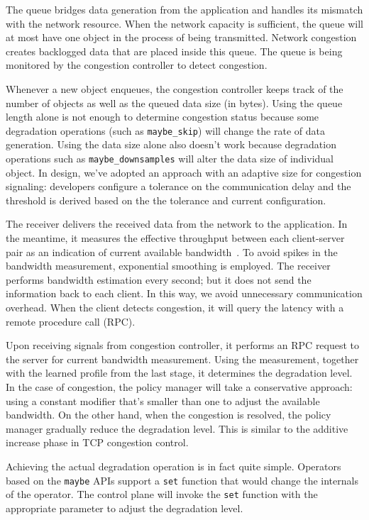  The queue bridges data generation from the
application and handles its mismatch with the network resource. When the network
capacity is sufficient, the queue will at most have one object in the process of
being transmitted. Network congestion creates backlogged data that are placed
inside this queue. The queue is being monitored by the congestion controller to
detect congestion.

 Whenever a new object enqueues, the congestion
controller keeps track of the number of objects as well as the queued data size
(in bytes). Using the queue length alone is not enough to determine congestion
status because some degradation operations (such as \texttt{maybe\_skip}) will
change the rate of data generation. Using the data size alone also doesn't work
because degradation operations such as \texttt{maybe\_downsamples} will alter
the data size of individual object. In \sysname{} design, we've adopted an
approach with an adaptive size for congestion signaling: developers configure a
tolerance on the communication delay and the threshold is derived based on the
the tolerance and current configuration.

 The receiver delivers the received data from the
network to the application. In the meantime, it measures the effective
throughput between each client-server pair as an indication of current available
bandwidth~\cite{iperf}. To avoid spikes in the bandwidth measurement,
exponential smoothing is employed. The receiver performs bandwidth estimation
every second; but it does not send the information back to each client. In this
way, we avoid unnecessary communication overhead. When the client detects
congestion, it will query the latency with a remote procedure call (RPC).

 Upon receiving signals from congestion controller, it
performs an RPC request to the server for current bandwidth measurement. Using
the measurement, together with the learned profile from the last stage, it
determines the degradation level. In the case of congestion, the policy manager
will take a conservative approach: using a constant modifier that's smaller than
one to adjust the available bandwidth. On the other hand, when the congestion is
resolved, the policy manager gradually reduce the degradation level. This is
similar to the additive increase phase in TCP congestion control.

 Achieving the actual degradation operation is in fact quite
simple. Operators based on the \texttt{maybe} APIs support a \texttt{set}
function that would change the internals of the operator. The control plane will
invoke the \texttt{set} function with the appropriate parameter to adjust the
degradation level.

